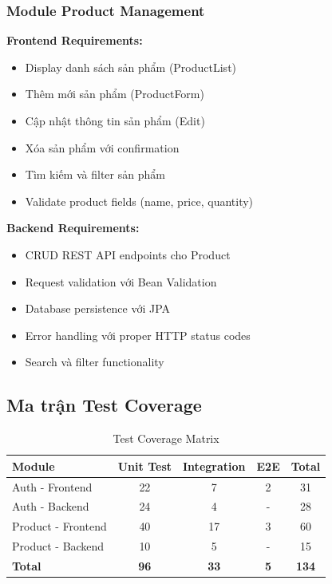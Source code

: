 \subsubsection{Module Product Management}
\textbf{Frontend Requirements:}
\begin{itemize}
    \item Display danh sách sản phẩm (ProductList)
    \item Thêm mới sản phẩm (ProductForm)
    \item Cập nhật thông tin sản phẩm (Edit)
    \item Xóa sản phẩm với confirmation
    \item Tìm kiếm và filter sản phẩm
    \item Validate product fields (name, price, quantity)
\end{itemize}

\textbf{Backend Requirements:}
\begin{itemize}
    \item CRUD REST API endpoints cho Product
    \item Request validation với Bean Validation
    \item Database persistence với JPA
    \item Error handling với proper HTTP status codes
    \item Search và filter functionality
\end{itemize}

\subsection{Ma trận Test Coverage}

\begin{table}[H]
\centering
\small
\begin{tabular}{|l|c|c|c|c|}
\hline
\textbf{Module} & \textbf{Unit Test} & \textbf{Integration} & \textbf{E2E} & \textbf{Total} \\
\hline
Auth - Frontend & 22 & 7 & 2 & 31 \\
\hline
Auth - Backend & 24 & 4 & - & 28 \\
\hline
Product - Frontend & 40 & 17 & 3 & 60 \\
\hline
Product - Backend & 10 & 5 & - & 15 \\
\hline
\textbf{Total} & \textbf{96} & \textbf{33} & \textbf{5} & \textbf{134} \\
\hline
\end{tabular}
\caption{Test Coverage Matrix}
\end{table}

